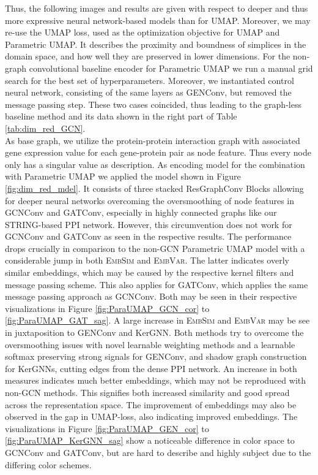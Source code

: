 \documentclass[]{article}
\begin{document}
Thus, the following images and results are given with respect to deeper and thus more expressive neural network-based models than for UMAP. Moreover, we may re-use the UMAP loss, used as the optimization objective for UMAP and Parametric UMAP. It describes the proximity and boundness of simplices in the domain space, and how well they are preserved in lower dimensions.
For the non-graph convolutional baseline encoder for Parametric UMAP we run a manual grid search for the best set of hyperparameters. Moreover, we instantiated control neural network, consisting of the same layers as GENConv, but removed the message passing step. These two cases coincided, thus leading to the graph-less baseline method and its data shown in the right part of Table \ref{tab:dim_red_GCN}.\\
As base graph, we utilize the protein-protein interaction graph with associated gene expression value for each gene-protein pair as node feature. Thus every node only has a singular value as description. As encoding model for the combination with Parametric UMAP we applied the model shown in Figure \ref{fig:dim_red_mdel}. It consists of three stacked ResGraphConv Blocks allowing for deeper neural networks overcoming the oversmoothing of node features in GCNConv and GATConv, especially in highly connected graphs like our STRING-based PPI network.
However, this circumvention does not work for GCNConv and GATConv as seen in the respective results. The performance drops crucially in comparison to the non-GCN Parametric UMAP model with a considerable jump in both \textsc{EmbSim} and \textsc{EmbVar}. The latter indicates overly similar embeddings, which may be caused by the respective kernel filters and message passing scheme. This also applies for GATConv, which applies the same message passing approach as GCNConv. Both may be seen in their respective visualizations in Figure \ref{fig:ParaUMAP_GCN_cor} to \ref{fig:ParaUMAP_GAT_sag}.
A large increase in \textsc{EmbSim} and \textsc{EmbVar} may be see in juxtaposition to GENConv and KerGNN. Both methods try to overcome the oversmoothing issues with novel learnable weighting methods and a learnable softmax preserving strong signals for GENConv, and shadow graph construction for KerGNNs, cutting edges from the dense PPI network. An increase in both measures indicates much better embeddings, which may not be reproduced with non-GCN methods. This signifies both increased similarity and good spread across the representation space. The improvement of embeddings may also be observed in the gap in UMAP-loss, also indicating improved embeddings. The visualizations in Figure \ref{fig:ParaUMAP_GEN_cor} to \ref{fig:ParaUMAP_KerGNN_sag} show a noticeable difference in color space to GCNConv and GATConv, but are hard to describe and highly subject due to the differing color schemes.
\end{document}
